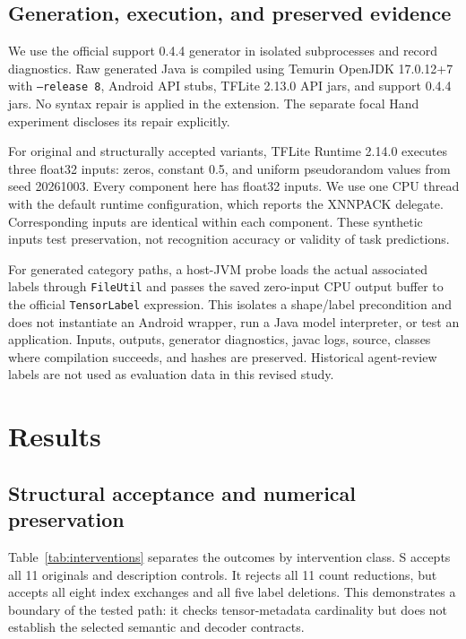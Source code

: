 \documentclass[10pt,twocolumn,letterpaper]{article}
\newcommand{\code}[1]{\texttt{#1}}
\begin{document}
\subsection{Generation, execution, and preserved evidence}
We use the official support 0.4.4 generator in isolated subprocesses and record diagnostics. Raw generated Java is compiled using Temurin OpenJDK 17.0.12+7 with \code{--release 8}, Android API stubs, TFLite 2.13.0 API jars, and support 0.4.4 jars. No syntax repair is applied in the extension. The separate focal Hand experiment discloses its repair explicitly.

For original and structurally accepted variants, TFLite Runtime 2.14.0 executes three float32 inputs: zeros, constant 0.5, and uniform pseudorandom values from seed 20261003. Every component here has float32 inputs. We use one CPU thread with the default runtime configuration, which reports the XNNPACK delegate. Corresponding inputs are identical within each component. These synthetic inputs test preservation, not recognition accuracy or validity of task predictions.

For generated category paths, a host-JVM probe loads the actual associated labels through \code{FileUtil} and passes the saved zero-input CPU output buffer to the official \code{TensorLabel} expression. This isolates a shape/label precondition and does not instantiate an Android wrapper, run a Java model interpreter, or test an application. Inputs, outputs, generator diagnostics, javac logs, source, classes where compilation succeeds, and hashes are preserved. Historical agent-review labels are not used as evaluation data in this revised study.

\section{Results}
\subsection{Structural acceptance and numerical preservation}
Table~\ref{tab:interventions} separates the outcomes by intervention class. S accepts all 11 originals and description controls. It rejects all 11 count reductions, but accepts all eight index exchanges and all five label deletions. This demonstrates a boundary of the tested path: it checks tensor-metadata cardinality but does not establish the selected semantic and decoder contracts.

\begin{table}[t]
\centering\small
\setlength{\tabcolsep}{3pt}

\caption{Extension counts, including duplicate graph representations. S: structurally accepted variants; CPU: interpreter invocations; J: raw javac successes; D: successful/exceptional isolated category probes. Structurally rejected variants are not compiled or executed. Missing D counts indicate no applicable generated category path.}
\label{tab:interventions}
\end{table}
\end{document}
